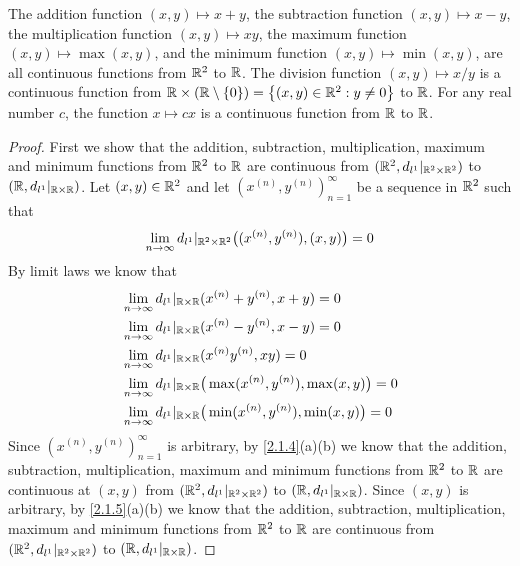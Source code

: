 \begin{lem}\label{2.2.2}
  The addition function \((x, y) \mapsto x + y\), the subtraction function \((x, y) \mapsto x - y\), the multiplication function \((x, y) \mapsto xy\), the maximum function \((x, y) \mapsto \max(x, y)\), and the minimum function \((x, y) \mapsto \min(x, y)\), are all continuous functions from \(\mathbb{R}^2\) to \(\mathbb{R}\).
  The division function \((x, y) \mapsto x / y\) is a continuous function from \(\mathbb{R} \times (\mathbb{R} \setminus \left\lbrace0\right\rbrace) = \left\lbrace(x, y) \in \mathbb{R}^2 : y \neq 0\right\rbrace\) to \(\mathbb{R}\).
  For any real number \(c\), the function \(x \mapsto cx\) is a continuous function from \(\mathbb{R}\) to \(\mathbb{R}\).
\end{lem}

\begin{proof}
  First we show that the addition, subtraction, multiplication, maximum and minimum functions from \(\mathbb{R}^2\) to \(\mathbb{R}\) are continuous from \((\mathbb{R}^2, d_{l^1}|_{\mathbb{R}^2 \times \mathbb{R}^2})\) to \((\mathbb{R}, d_{l^1}|_{\mathbb{R} \times \mathbb{R}})\).
  Let \((x, y) \in \mathbb{R}^2\) and let \((x^{(n)}, y^{(n)})_{n = 1}^\infty\) be a sequence in \(\mathbb{R}^2\) such that
  \[
    \lim_{n \to \infty} d_{l^1}|_{\mathbb{R}^2 \times \mathbb{R}^2}\big((x^{(n)}, y^{(n)}), (x, y)\big) = 0
  \]
  By limit laws we know that
  \begin{align*}
     & \lim_{n \to \infty} d_{l^1}|_{\mathbb{R} \times \mathbb{R}}(x^{(n)} + y^{(n)}, x + y) = 0                   \\
     & \lim_{n \to \infty} d_{l^1}|_{\mathbb{R} \times \mathbb{R}}(x^{(n)} - y^{(n)}, x - y) = 0                   \\
     & \lim_{n \to \infty} d_{l^1}|_{\mathbb{R} \times \mathbb{R}}(x^{(n)} y^{(n)}, xy) = 0                        \\
     & \lim_{n \to \infty} d_{l^1}|_{\mathbb{R} \times \mathbb{R}}\big(\max(x^{(n)}, y^{(n)}), \max(x, y)\big) = 0 \\
     & \lim_{n \to \infty} d_{l^1}|_{\mathbb{R} \times \mathbb{R}}\big(\min(x^{(n)}, y^{(n)}), \min(x, y)\big) = 0 \\
  \end{align*}
  Since \((x^{(n)}, y^{(n)})_{n = 1}^\infty\) is arbitrary, by \cref{2.1.4}(a)(b) we know that the addition, subtraction, multiplication, maximum and minimum functions from \(\mathbb{R}^2\) to \(\mathbb{R}\) are continuous at \((x, y)\) from \((\mathbb{R}^2, d_{l^1}|_{\mathbb{R}^2 \times \mathbb{R}^2})\) to \((\mathbb{R}, d_{l^1}|_{\mathbb{R} \times \mathbb{R}})\).
  Since \((x, y)\) is arbitrary, by \cref{2.1.5}(a)(b) we know that the addition, subtraction, multiplication, maximum and minimum functions from \(\mathbb{R}^2\) to \(\mathbb{R}\) are continuous from \((\mathbb{R}^2, d_{l^1}|_{\mathbb{R}^2 \times \mathbb{R}^2})\) to \((\mathbb{R}, d_{l^1}|_{\mathbb{R} \times \mathbb{R}})\).


\end{proof}
